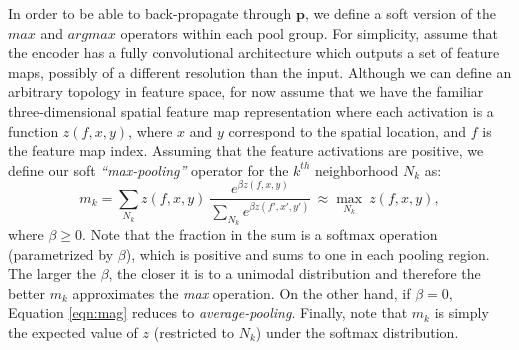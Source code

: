 \documentclass{article} %
\begin{document}
In order to be able to back-propagate through $\mathbf{p}$, we define a soft version of the $max$ and $argmax$ operators within each pool group. For simplicity, assume that the encoder has a fully convolutional architecture which outputs a set of feature maps, possibly of a different resolution than the input. 
Although we can define an arbitrary topology in feature space, for now assume that we have the familiar three-dimensional spatial feature map representation where each activation is a function $z(f,x,y)$, where $x$ and $y$ correspond to the spatial location, and $f$ is the feature map index. Assuming that the feature activations are positive, we define our soft \emph{``max-pooling''} operator for the $k^{th}$ neighborhood $N_k$ as:
\begin{equation}
m_k = \sum_{N_k} z(f,x,y)\!~ \frac{e^{\beta z(f,x,y)}}{\sum_{N_k}e^{\beta z(f\prime, x\prime, y\prime )}}\, \approx\underset{N_k}\max~z(f,x,y),
\label{eqn:mag}
\end{equation}   
where $\beta \geq 0$.
Note that the fraction in the sum is a softmax operation (parametrized by $\beta$), which is positive and sums to one in each pooling region. The larger the $\beta$, the closer it is to a unimodal distribution and therefore the better $m_k$ approximates the \emph{max} operation. On the other hand, if $\beta=0$, Equation \ref{eqn:mag} reduces to \emph{average-pooling}. Finally, note that $m_k$ is simply the expected value of $z$ (restricted to $N_k$) under the softmax distribution.
\end{document}
